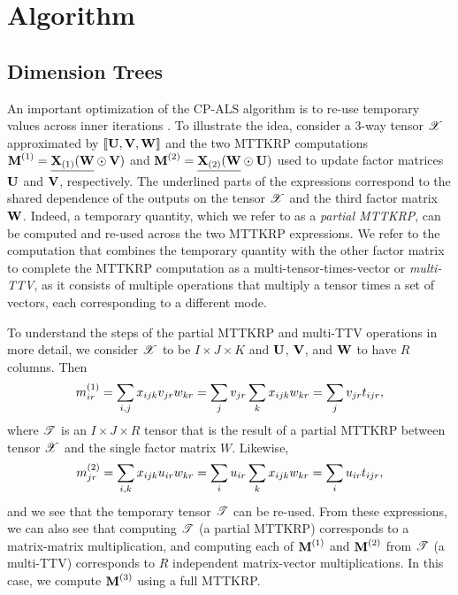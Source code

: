 
\section{Algorithm} 
\label{sec:algorithm}

\subsection{Dimension Trees}
\label{sec:dimtrees}

An important optimization of the CP-ALS algorithm is to re-use temporary values across inner iterations \cite{PTC13a,KU16-TR,LCPSV17,Kaya17}.
To illustrate the idea, consider a 3-way tensor $\T{X}$ approximated by $\dsquare{\M{U},\M{V},\M{W}}$ and the two MTTKRP computations $\Mn{M}{1}=\underline{\Mz{X}{1}(\M{W}}\Khat\M{V})$ and $\Mn{M}{2}=\underline{\Mz{X}{2}(\M{W}}\Khat\M{U})$ used to update factor matrices $\M{U}$ and $\M{V}$, respectively.
The underlined parts of the expressions correspond to the shared dependence of the outputs on the tensor $\T{X}$ and the third factor matrix $\M{W}$.
Indeed, a temporary quantity, which we refer to as a \emph{partial MTTKRP}, can be computed and re-used across the two MTTKRP expressions.
We refer to the computation that combines the temporary quantity with the other factor matrix to complete the MTTKRP computation as a multi-tensor-times-vector or \emph{multi-TTV}, as it consists of multiple operations that multiply a tensor times a set of vectors, each corresponding to a different mode.

To understand the steps of the partial MTTKRP and multi-TTV operations in more detail, we consider $\T{X}$ to be $I\times J\times K$ and $\M{U}$, $\M{V}$, and $\M{W}$ to have $R$ columns.
Then 
\begin{equation*}
\MnE{M}{1}{ir} = \sum_{i,j} \TE{X}{ijk} \ME{V}{jr} \ME{W}{kr} 
= \sum_{j} \ME{V}{jr} \sum_k \TE{X}{ijk} \ME{W}{kr} 
= \sum_{j} \ME{V}{jr} \TE{T}{ijr},
\end{equation*}
where $\T{T}$ is an $I\times J\times R$ tensor that is the result of a partial MTTKRP between tensor $\T{X}$ and the single factor matrix $W$.
Likewise,
\begin{equation*}
\MnE{M}{2}{jr} = \sum_{i,k} \TE{X}{ijk} \ME{U}{ir} \ME{W}{kr} 
= \sum_{i} \ME{U}{ir} \sum_k \TE{X}{ijk} \ME{W}{kr} 
= \sum_{i} \ME{U}{ir} \TE{T}{ijr},
\end{equation*}
and we see that the temporary tensor $\T{T}$ can be re-used.
From these expressions, we can also see that computing $\T{T}$ (a partial MTTKRP) corresponds to a matrix-matrix multiplication, and computing each of $\Mn{M}{1}$ and $\Mn{M}{2}$ from $\T{T}$ (a multi-TTV) corresponds to $R$ independent matrix-vector multiplications.
In this case, we compute $\Mn{M}{3}$ using a full MTTKRP.


